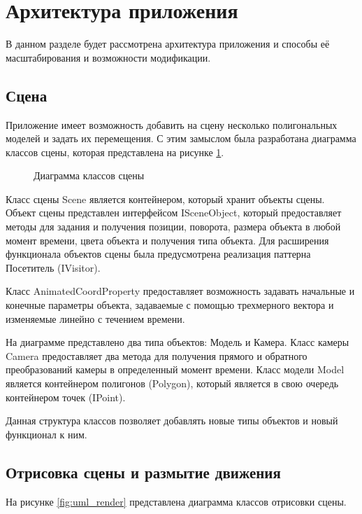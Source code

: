 \section{Архитектура приложения}

В данном разделе будет рассмотрена архитектура приложения и способы её масштабирования и возможности модификации.

\subsection{Сцена}

Приложение имеет возможность добавить на сцену несколько полигональных моделей и задать их перемещения. С этим замыслом была разработана диаграмма классов сцены, которая представлена на рисунке \ref{fig:uml_scene}.

\begin{figure}[h]
    \centering
    
    \caption{Диаграмма классов сцены}
    \label{fig:uml_scene}
\end{figure}

Класс сцены Scene является контейнером, который хранит объекты сцены. Объект сцены представлен интерфейсом ISceneObject, который предоставляет методы для задания и получения позиции, поворота, размера объекта в любой момент времени, цвета объекта и получения типа объекта. Для расширения функционала объектов сцены была предусмотрена реализация паттерна Посетитель (IVisitor).

Класс AnimatedCoordProperty предоставляет возможность задавать начальные и конечные параметры объекта, задаваемые с помощью трехмерного вектора и изменяемые линейно с течением времени.

На диаграмме представлено два типа объектов: Модель и Камера. Класс камеры Camera предоставляет два метода для получения прямого и обратного преобразований камеры в определенный момент времени. Класс модели Model является контейнером полигонов (Polygon), который является в свою очередь контейнером точек (IPoint).   

Данная структура классов позволяет добавлять новые типы объектов и новый функционал к ним. 

\subsection{Отрисовка сцены и размытие движения}
На рисунке \ref{fig:uml_render} представлена диаграмма классов отрисовки сцены.  

